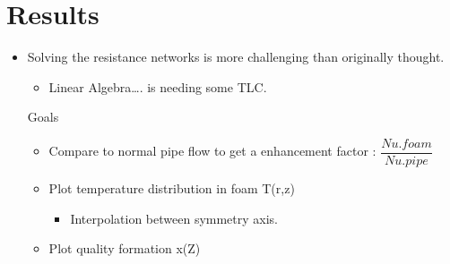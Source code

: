 \documentclass[compileTAMUreport.tex]{subfiles}
\begin{document}
\section{Results}
\begin{itemize}
\item Solving the resistance networks is more challenging than originally thought.
\begin{itemize}
\item Linear Algebra…. is needing some TLC.
\end{itemize}
Goals 
\begin{itemize}
\item
Compare to normal pipe flow to get a enhancement factor :               
$\dfrac{Nu.foam}{Nu.pipe}$ 
\item Plot temperature distribution in foam T(r,z)
\begin{itemize}
\item Interpolation between symmetry axis.
\end{itemize}
\item Plot quality formation x(Z)
\end{itemize}
\end{itemize}
\end{document}
